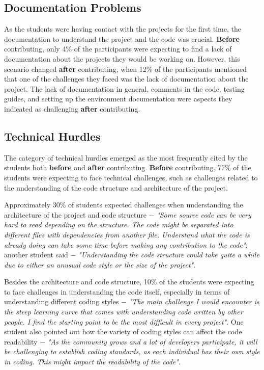 \documentclass[sigconf]{acmart}
\begin{document}
\begin{sloppy}
\subsection{Documentation Problems}

As the students were having contact with the projects for the first time, the documentation to understand the project and the code was crucial. \textbf{Before} contributing, only 4\% of the participants were expecting to find a lack of documentation about the projects they would be working on. However, this scenario changed \textbf{after} contributing, when 12\% of the participants mentioned that one of the challenges they faced was the lack of documentation about the project. The lack of documentation in general, comments in the code, testing guides, and setting up the environment documentation were aspects they indicated as challenging \textbf{after} contributing.

\subsection{Technical Hurdles}

The category of technical hurdles emerged as the most frequently cited by the students both \textbf{before} and \textbf{after} contributing. \textbf{Before} contributing, 77\% of the students were expecting to face technical challenges, such as challenges related to the understanding of the code structure and architecture of the project. 

Approximately 30\% of students expected challenges when understanding the architecture of the project and code structure $-$ \textit{"Some source code can be very hard to read depending on the structure. The code might be separated into different files with dependencies from another file. Understand what the code is already doing can take some time before making any contribution to the code"}; another student said $-$ \textit{"Understanding the code structure could take quite a while due to either an unusual code style or the size of the project"}. 



Besides the architecture and code structure, 10\% of the students were expecting to face challenges in understanding the code itself, especially in terms of understanding different coding styles $-$ \textit{"The main challenge I would encounter is the steep learning curve that comes with understanding code written by other people. I find the starting point to be the most difficult in every project"}. One student also pointed out how the variety of coding styles can affect the code readability $-$ \textit{"As the community grows and a lot of developers participate, it will be challenging to establish coding standards, as each individual has their own style in coding. This might impact the readability of the code"}. 


\end{sloppy}
\end{document}

